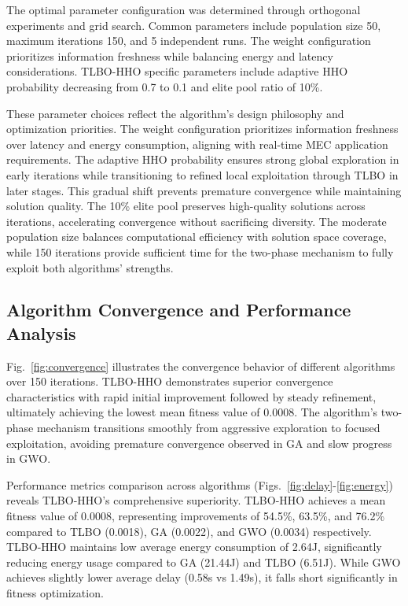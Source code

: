 \documentclass[conference]{IEEEtran}
\begin{document}
The optimal parameter configuration was determined through orthogonal experiments and grid search. Common parameters include population size 50, maximum iterations 150, and 5 independent runs. The weight configuration prioritizes information freshness while balancing energy and latency considerations. TLBO-HHO specific parameters include adaptive HHO probability decreasing from 0.7 to 0.1 and elite pool ratio of 10\%.

These parameter choices reflect the algorithm's design philosophy and optimization priorities. The weight configuration prioritizes information freshness over latency and energy consumption, aligning with real-time MEC application requirements. The adaptive HHO probability ensures strong global exploration in early iterations while transitioning to refined local exploitation through TLBO in later stages. This gradual shift prevents premature convergence while maintaining solution quality. The 10\% elite pool preserves high-quality solutions across iterations, accelerating convergence without sacrificing diversity. The moderate population size balances computational efficiency with solution space coverage, while 150 iterations provide sufficient time for the two-phase mechanism to fully exploit both algorithms' strengths.

\subsection{Algorithm Convergence and Performance Analysis}

Fig.~\ref{fig:convergence} illustrates the convergence behavior of different algorithms over 150 iterations. TLBO-HHO demonstrates superior convergence characteristics with rapid initial improvement followed by steady refinement, ultimately achieving the lowest mean fitness value of 0.0008. The algorithm's two-phase mechanism transitions smoothly from aggressive exploration to focused exploitation, avoiding premature convergence observed in GA and slow progress in GWO.

Performance metrics comparison across algorithms (Figs.~\ref{fig:delay}-\ref{fig:energy}) reveals TLBO-HHO's comprehensive superiority. TLBO-HHO achieves a mean fitness value of 0.0008, representing improvements of 54.5\%, 63.5\%, and 76.2\% compared to TLBO (0.0018), GA (0.0022), and GWO (0.0034) respectively. TLBO-HHO maintains low average energy consumption of 2.64J, significantly reducing energy usage compared to GA (21.44J) and TLBO (6.51J). While GWO achieves slightly lower average delay (0.58s vs 1.49s), it falls short significantly in fitness optimization.
\end{document}
